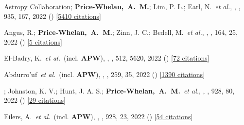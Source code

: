 \item[{\color{deemph}\scriptsize104}]Astropy Collaboration; \textbf{Price-Whelan,~A.~M.}; Lim, P. L.; Earl, N.~\textit{et al.}, , \apj, 935, 167, 2022 () [\href{http://adsabs.harvard.edu/abs/2022ApJ...935..167A}{5410 citations}]

\item[{\color{deemph}\scriptsize103}]Angus, R.; \textbf{Price-Whelan,~A.~M.}; Zinn, J. C.; Bedell, M.~\textit{et al.}, , \aj, 164, 25, 2022 () [\href{http://adsabs.harvard.edu/abs/2022AJ....164...25A}{5 citations}]

\item[{\color{deemph}\scriptsize102}]El-Badry, K.~\textit{et al.}~(incl. \textbf{APW}), , \mnras, 512, 5620, 2022 () [\href{http://adsabs.harvard.edu/abs/2022MNRAS.512.5620E}{72 citations}]

\item[{\color{deemph}\scriptsize101}]Abdurro'uf~\textit{et al.}~(incl. \textbf{APW}), , \apjs, 259, 35, 2022 () [\href{http://adsabs.harvard.edu/abs/2022ApJS..259...35A}{1390 citations}]

\item[{\color{deemph}\scriptsize100}]; Johnston, K. V.; Hunt, J. A. S.; \textbf{Price-Whelan,~A.~M.}~\textit{et al.}, , \apj, 928, 80, 2022 () [\href{http://adsabs.harvard.edu/abs/2022ApJ...928...80G}{29 citations}]

\item[{\color{deemph}\scriptsize99}]Eilers, A.~\textit{et al.}~(incl. \textbf{APW}), , \apj, 928, 23, 2022 () [\href{http://adsabs.harvard.edu/abs/2022ApJ...928...23E}{54 citations}]

